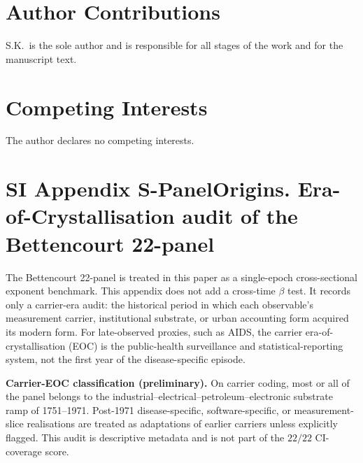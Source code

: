 \section*{Author Contributions}

S.K.\ is the sole author and is responsible for all stages of the work and for the manuscript text.

\section*{Competing Interests}

The author declares no competing interests.







\section*{SI Appendix S-PanelOrigins. Era-of-Crystallisation audit of the Bettencourt 22-panel}\label{sec:S-PanelOrigins}

The Bettencourt 22-panel is treated in this paper as a single-epoch cross-sectional exponent benchmark. This appendix does not add a cross-time \(\beta\) test. It records only a carrier-era audit: the historical period in which each observable's measurement carrier, institutional substrate, or urban accounting form acquired its modern form. For late-observed proxies, such as AIDS, the carrier era-of-crystallisation (EOC) is the public-health surveillance and statistical-reporting system, not the first year of the disease-specific episode.

\textbf{Carrier-EOC classification (preliminary).} On carrier coding, most or all of the panel belongs to the industrial--electrical--petroleum--electronic substrate ramp of 1751--1971. Post-1971 disease-specific, software-specific, or measurement-slice realisations are treated as adaptations of earlier carriers unless explicitly flagged. This audit is descriptive metadata and is not part of the \(22/22\) CI-coverage score.

